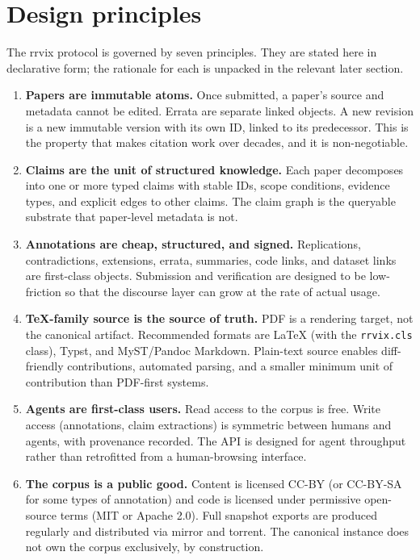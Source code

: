 \documentclass[11pt]{rrvix}
\begin{document}
\section{Design principles}
\label{sec:principles}

The rrvix protocol is governed by seven principles. They are stated here in declarative form; the rationale for each is unpacked in the relevant later section.

\begin{enumerate}[leftmargin=2em, itemsep=0.4em]

\item \textbf{Papers are immutable atoms.} Once submitted, a paper's source and metadata cannot be edited. Errata are separate linked objects. A new revision is a new immutable version with its own ID, linked to its predecessor. This is the property that makes citation work over decades, and it is non-negotiable.

\item \textbf{Claims are the unit of structured knowledge.} Each paper decomposes into one or more typed claims with stable IDs, scope conditions, evidence types, and explicit edges to other claims. The claim graph is the queryable substrate that paper-level metadata is not.

\item \textbf{Annotations are cheap, structured, and signed.} Replications, contradictions, extensions, errata, summaries, code links, and dataset links are first-class objects. Submission and verification are designed to be low-friction so that the discourse layer can grow at the rate of actual usage.

\item \textbf{TeX-family source is the source of truth.} PDF is a rendering target, not the canonical artifact. Recommended formats are LaTeX (with the \texttt{rrvix.cls} class), Typst, and MyST/Pandoc Markdown. Plain-text source enables diff-friendly contributions, automated parsing, and a smaller minimum unit of contribution than PDF-first systems.

\item \textbf{Agents are first-class users.} Read access to the corpus is free. Write access (annotations, claim extractions) is symmetric between humans and agents, with provenance recorded. The API is designed for agent throughput rather than retrofitted from a human-browsing interface.

\item \textbf{The corpus is a public good.} Content is licensed CC-BY (or CC-BY-SA for some types of annotation) and code is licensed under permissive open-source terms (MIT or Apache 2.0). Full snapshot exports are produced regularly and distributed via mirror and torrent. The canonical instance does not own the corpus exclusively, by construction.


\end{enumerate}
\end{document}
